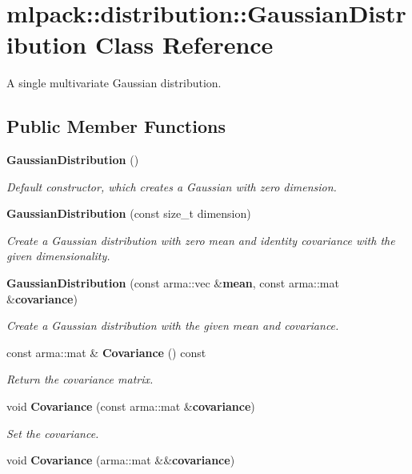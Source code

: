 \section{mlpack\+:\+:distribution\+:\+:Gaussian\+Distribution Class Reference}
\label{classmlpack_1_1distribution_1_1GaussianDistribution}


A single multivariate Gaussian distribution.  


\subsection*{Public Member Functions}
\begin{DoxyCompactItemize}
\item 
{\bf Gaussian\+Distribution} ()
\begin{DoxyCompactList}\small\item\em Default constructor, which creates a Gaussian with zero dimension. \end{DoxyCompactList}\item 
{\bf Gaussian\+Distribution} (const size\+\_\+t dimension)
\begin{DoxyCompactList}\small\item\em Create a Gaussian distribution with zero mean and identity covariance with the given dimensionality. \end{DoxyCompactList}\item 
{\bf Gaussian\+Distribution} (const arma\+::vec \&{\bf mean}, const arma\+::mat \&{\bf covariance})
\begin{DoxyCompactList}\small\item\em Create a Gaussian distribution with the given mean and covariance. \end{DoxyCompactList}\item 
const arma\+::mat \& {\bf Covariance} () const 
\begin{DoxyCompactList}\small\item\em Return the covariance matrix. \end{DoxyCompactList}\item 
void {\bf Covariance} (const arma\+::mat \&{\bf covariance})
\begin{DoxyCompactList}\small\item\em Set the covariance. \end{DoxyCompactList}\item 
void {\bf Covariance} (arma\+::mat \&\&{\bf covariance})

\end{DoxyCompactItemize}
